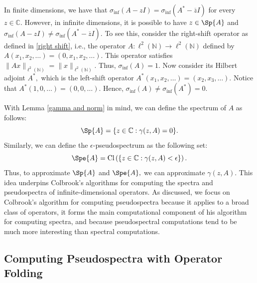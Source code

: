 In finite dimensions, we have that $\sigma_{\inf}(A-zI) = \sigma_{\inf}(A^*-\overline{z}I)$ for every $z \in \mathbb{C}.$ However, in infinite dimensions, it is possible to have $z \in \Sp{A}$ and $\sigma_{\inf}(A-zI) \ne \sigma_{\inf}(A^*-\overline{z}I).$ To see this, consider the right-shift operator as defined in \eqref{right shift}, i.e., the operator $A:\ell^2(\mathbb{N}) \rightarrow \ell^2(\mathbb{N})$ defined by $A(x_1, x_2, \dots) = (0, x_1, x_2, \dots).$ This operator satisfies $\|Ax\|_{\ell^2(\mathbb{N})} = \|x\|_{\ell^2(\mathbb{N})}.$ Thus, $\sigma_{\inf}(A) = 1.$ Now consider its Hilbert adjoint $A^*,$ which is the left-shift operator $A^*(x_1, x_2, \dots) = (x_2, x_3, \dots).$ Notice that $A^*(1, 0, \dots) = (0, 0, \dots).$ Hence, $\sigma_{\inf}(A) \ne \sigma_{\inf}(A^*) = 0.$

With Lemma \ref{gamma and norm} in mind, we can define the spectrum of $A$ as follows:
\begin{equation}\label{gamma Sp}
    \Sp{A} = \{ z \in \mathbb{C} : \gamma(z, A) = 0\}.
\end{equation}
Similarly, we can define the $\epsilon$-pseudospectrum as the following set:
\begin{equation} \label{gamma eps Sp}
    \Spe{A} = \operatorname{Cl} \left(\{ z \in \mathbb{C} : \gamma(z, A) < \epsilon\}\right).
\end{equation}
Thus, to approximate $\Sp{A}$ and $\Spe{A},$ we can approximate $\gamma(z, A).$ This idea underpins Colbrook's algorithms for computing the spectra and pseudospectra of infinite-dimensional operators. As discussed, we focus on Colbrook's algorithm for computing pseudospectra because it applies to a broad class of operators, it forms the main computational component of his algorithm for computing spectra, and because pseudospectral computations tend to be much more interesting than spectral computations. 


\subsection{Computing Pseudospectra with Operator Folding} \label{Fold sect}

